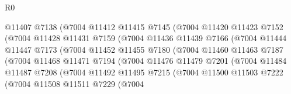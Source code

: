 \begin{lexlean}{R0}
\begin{coremodule}
                            @11407
                            @7138
                            (@7004
                              @11412
                              @11415
                              @7145
                              (@7004
                                @11420
                                @11423
                                @7152
                                (@7004
                                  @11428
                                  @11431
                                  @7159
                                  (@7004
                                    @11436
                                    @11439
                                    @7166
                                    (@7004
                                      @11444
                                      @11447
                                      @7173
                                      (@7004
                                        @11452
                                        @11455
                                        @7180
                                        (@7004
                                          @11460
                                          @11463
                                          @7187
                                          (@7004
                                            @11468
                                            @11471
                                            @7194
                                            (@7004
                                              @11476
                                              @11479
                                              @7201
                                              (@7004
                                                @11484
                                                @11487
                                                @7208
                                                (@7004
                                                  @11492
                                                  @11495
                                                  @7215
                                                  (@7004
                                                    @11500
                                                    @11503
                                                    @7222
                                                    (@7004
                                                      @11508
                                                      @11511
                                                      @7229
                                                      (@7004

\end{coremodule}
\end{lexlean}

